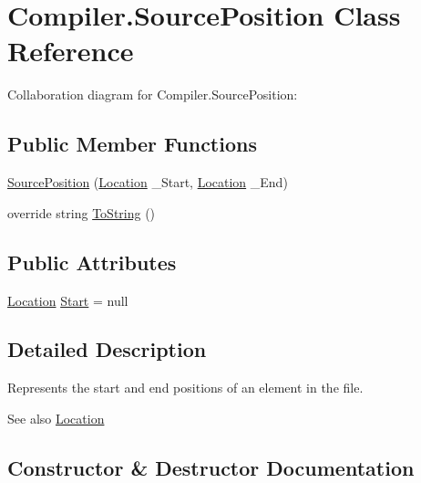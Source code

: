 \hypertarget{class_compiler_1_1_source_position}{}\section{Compiler.\+Source\+Position Class Reference}
\label{class_compiler_1_1_source_position}


Collaboration diagram for Compiler.\+Source\+Position\+:
\subsection*{Public Member Functions}
\begin{DoxyCompactItemize}
\item 
\mbox{\hyperlink{class_compiler_1_1_source_position_ac8eeb6d20c8a788dfe27345b435bb035}{Source\+Position}} (\mbox{\hyperlink{class_compiler_1_1_location}{Location}} \+\_\+\+Start, \mbox{\hyperlink{class_compiler_1_1_location}{Location}} \+\_\+\+End)
\item 
override string \mbox{\hyperlink{class_compiler_1_1_source_position_a95b14602e2629b906f29ef194d4f88f6}{To\+String}} ()
\end{DoxyCompactItemize}
\subsection*{Public Attributes}
\begin{DoxyCompactItemize}
\item 
\mbox{\hyperlink{class_compiler_1_1_location}{Location}} \mbox{\hyperlink{class_compiler_1_1_source_position_ad7c78fd184a393fc62cb5ee8678db0c8}{Start}} = null
\end{DoxyCompactItemize}


\subsection{Detailed Description}
Represents the start and end positions of an element in the file. \begin{DoxySeeAlso}{See also}
\mbox{\hyperlink{class_compiler_1_1_location}{Location}} 
\end{DoxySeeAlso}


\subsection{Constructor \& Destructor Documentation}
\mbox{\label{class_compiler_1_1_source_position_ac8eeb6d20c8a788dfe27345b435bb035}} 
